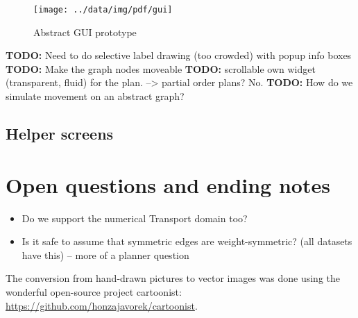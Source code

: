 \documentclass[10pt,a4paper,oneside]{article}
\newcommand{\TODO}[1]{{\textbf{TODO:} #1}} %
\begin{document}
\FloatBarrier
\begin{figure}
        \centering
        \texttt{[image: ../data/img/pdf/gui]}
        \caption{Abstract GUI prototype}
        \label{fig:gui}
\end{figure}
\FloatBarrier

\TODO Need to do selective label drawing (too crowded) with popup info boxes
\TODO Make the graph nodes moveable
\TODO scrollable own widget (transparent, fluid) for the plan. --> partial order plans? No.
\TODO How do we simulate movement on an abstract graph?

\subsection{Helper screens}















\section{Open questions and ending notes}

\begin{itemize}
    \item Do we support the numerical Transport domain too?
    \item Is it safe to assume that symmetric edges are weight-symmetric? (all datasets have this) -- more of a planner question
\end{itemize}

The conversion from hand-drawn pictures to vector images was done using the wonderful
open-source project cartoonist: \url{https://github.com/honzajavorek/cartoonist}.

{
\footnotesize %

}
\end{document}
